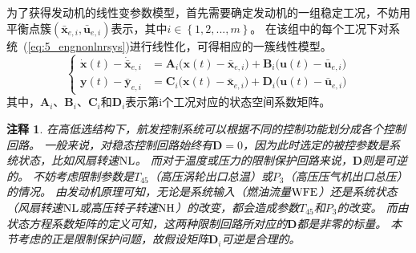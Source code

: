 \documentclass{article}
\newtheorem{remark}{注释}
\begin{document}
为了获得发动机的线性变参数模型，首先需要确定发动机的一组稳定工况，不妨用平衡点簇$(\bm{\bar x}_{e,i},\bm{\bar u}_{e,i})$表示，其中$i \in \left \{ 1,2,...,m \right \}$。
在该组中的每个工况下对系统~(\ref{eq:5_engnonlnrsys})进行线性化，可得相应的一簇线性模型。
\begin{equation}
\left \{
\begin{aligned}
   \dot{\bm{x}}(t)-\dot{\bm{\bar x}}_{e,i}&=\mathbf{A}_i\big ( \bm{x}(t)-\bm{\bar x}_{e,i} \big )+\mathbf{B}_i\big ( \bm{u}(t)-\bm{\bar u}_{e,i}\big )\\
   \bm{y}(t)-\bm{\bar y}_{e,i}&=\mathbf{C}_i\big ( \bm{x}(t)-\bm{\bar x}_{e,i}\big )+\mathbf{D}_i\big (\bm{u}(t)-\bm{\bar u}_{e,i}\big )
\end{aligned}
\right .
\label{eq:5_englnrsysgrp}
\end{equation}
其中，$\mathbf{A}_i$、$\mathbf{B}_i$、$\mathbf{C}_i$和$\mathbf{D}_i$表示第i个工况对应的状态空间系数矩阵。

\begin{remark}
\label{thm:4_remark_invertibleD}
\cite{Richter2011multi,Richter2012Multiple}
在高低选结构下，航发控制系统可以根据不同的控制功能划分成各个控制回路。
一般来说，对稳态控制回路始终有$\mathbf{D}=0$，因为此时选定的被控参数是系统状态，比如风扇转速$\rm{NL}$。
而对于温度或压力的限制保护回路来说，$\mathbf{D}$则是可逆的。
不妨考虑限制参数是$T_{45}$（高压涡轮出口总温）或$P_3$（高压压气机出口总压）的情况。
由发动机原理可知，无论是系统输入（燃油流量$\rm{WFE}$）还是系统状态（风扇转速$\rm{NL}$或高压转子转速$\rm{NH}$）的改变，都会造成参数$T_{45}$和$P_3$的改变。
而由状态方程系数矩阵的定义可知，这两种限制回路所对应的$\mathbf{D}$都是非零的标量。
本节考虑的正是限制保护问题，故假设矩阵$\mathbf{D}_i$可逆是合理的。
\end{remark}
\end{document}
